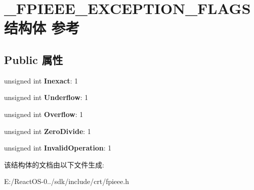\hypertarget{struct___f_p_i_e_e_e___e_x_c_e_p_t_i_o_n___f_l_a_g_s}{}\section{\+\_\+\+F\+P\+I\+E\+E\+E\+\_\+\+E\+X\+C\+E\+P\+T\+I\+O\+N\+\_\+\+F\+L\+A\+G\+S结构体 参考}
\label{struct___f_p_i_e_e_e___e_x_c_e_p_t_i_o_n___f_l_a_g_s}
\subsection*{Public 属性}
\begin{DoxyCompactItemize}
\item 
\mbox{\label{struct___f_p_i_e_e_e___e_x_c_e_p_t_i_o_n___f_l_a_g_s_a9bc8e35d70b1f63e4b047fa836054fde}} 
unsigned int {\bfseries Inexact}\+: 1
\item 
\mbox{\label{struct___f_p_i_e_e_e___e_x_c_e_p_t_i_o_n___f_l_a_g_s_adcef847af6192f67fcdf7194f95bc1c0}} 
unsigned int {\bfseries Underflow}\+: 1
\item 
\mbox{\label{struct___f_p_i_e_e_e___e_x_c_e_p_t_i_o_n___f_l_a_g_s_a2a63c27673f28765e25a1d7f0feb1f78}} 
unsigned int {\bfseries Overflow}\+: 1
\item 
\mbox{\label{struct___f_p_i_e_e_e___e_x_c_e_p_t_i_o_n___f_l_a_g_s_acfc0e7c405a697b095afaf5d11aab19c}} 
unsigned int {\bfseries Zero\+Divide}\+: 1
\item 
\mbox{\label{struct___f_p_i_e_e_e___e_x_c_e_p_t_i_o_n___f_l_a_g_s_aeb2d59cc66279935ae3d3964a1e1a144}} 
unsigned int {\bfseries Invalid\+Operation}\+: 1
\end{DoxyCompactItemize}


该结构体的文档由以下文件生成\+:\begin{DoxyCompactItemize}
\item 
E\+:/\+React\+O\+S-\/0../sdk/include/crt/fpieee.\+h\end{DoxyCompactItemize}
